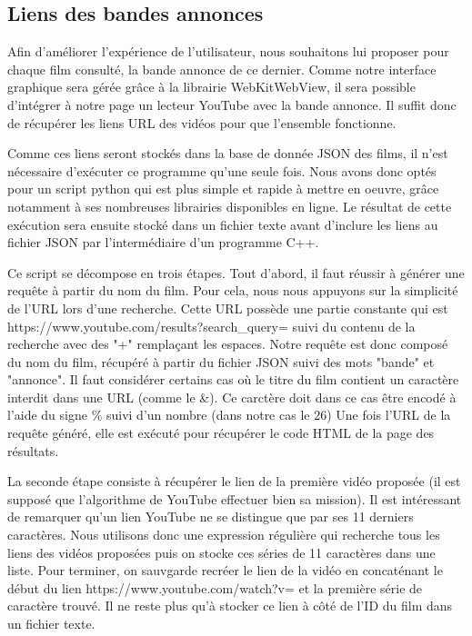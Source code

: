 \documentclass{report}
\begin{document}
\subsection{Liens des bandes annonces}
Afin d'améliorer l'expérience de l'utilisateur, nous souhaitons lui proposer pour chaque film consulté, la bande annonce de ce dernier.
Comme notre interface graphique sera gérée grâce à la librairie WebKitWebView, il sera possible d'intégrer à notre page un lecteur YouTube avec la bande annonce.
Il suffit donc de récupérer les liens URL des vidéos pour que l'ensemble fonctionne.\par
Comme ces liens seront stockés dans la base de donnée JSON des films, il n'est nécessaire d'exécuter ce programme qu'une seule fois. Nous avons donc optés pour un script python qui est plus simple et rapide à mettre en oeuvre, grâce notamment à ses nombreuses librairies disponibles en ligne. Le résultat de cette exécution sera ensuite stocké dans un fichier texte avant d'inclure les liens au fichier JSON par l'intermédiaire d'un programme C++.\par
\vspace{1cm}
Ce script se décompose en trois étapes.
  Tout d'abord, il faut réussir à générer une requête à partir du nom du film. Pour cela, nous nous appuyons sur la simplicité de l'URL lors d'une recherche. Cette URL possède une partie constante qui est https://www.youtube.com/results?search\_query=  suivi du contenu de la recherche avec des "+" remplaçant les espaces.
Notre requête est donc composé du nom du film, récupéré à partir du fichier JSON suivi des mots "bande" et "annonce". Il faut considérer certains cas où le titre du film contient un caractère interdit dans une URL (comme le \&). Ce carctère doit dans ce cas être encodé à l'aide du signe \% suivi d'un nombre (dans notre cas le 26)
Une fois l'URL de la requête généré, elle est exécuté pour récupérer le code HTML de la page des résultats.\par
La seconde étape consiste à récupérer le lien de la première vidéo proposée (il est supposé que l'algorithme de YouTube effectuer bien sa mission). Il est intéressant de remarquer qu'un lien YouTube ne se distingue que par ses 11 derniers caractères. Nous utilisons donc une expression régulière qui recherche tous les liens des vidéos proposées puis on stocke ces séries de 11 caractères dans une liste.
Pour terminer, on sauvgarde recréer le lien de la vidéo en concaténant le début du lien https://www.youtube.com/watch?v= et la première série de caractère trouvé. Il ne reste plus qu'à stocker ce lien à côté de l'ID du film dans un fichier texte.
\end{document}

